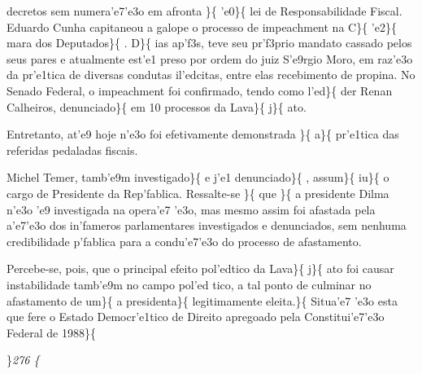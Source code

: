 decretos sem numera'e7'e3o em afronta \}\{\rtlch{}  \ltrch{}
 'e0\}\{\rtlch{}  \ltrch{}
 lei de Responsabilidade Fiscal. Eduardo
Cunha capitaneou a galope o processo de impeachment na C\}\{\rtlch{}
 \ltrch{}  'e2\}\{\rtlch{}  \ltrch{}
 mara dos Deputados\}\{\rtlch{} 
\ltrch{}  . D\}\{\rtlch{}  \ltrch{}
 ias ap'f3s, teve seu pr'f3prio mandato
cassado pelos seus pares e atualmente est'e1 preso por ordem do juiz
S'e9rgio Moro, em raz'e3o da pr'e1tica de diversas condutas il'edcitas,
entre elas recebimento de propina. No Senado Federal, o impeachment foi
confirmado, tendo como l'ed\}\{\rtlch{}  \ltrch{}
 der Renan Calheiros, denunciado\}\{\rtlch{} 
\ltrch{}  em 10 processos da
Lava\}\{\rtlch{}  \ltrch{}  j\}\{\rtlch{}
 \ltrch{}  ato. \par Entretanto,
at'e9 hoje n'e3o foi efetivamente demonstrada \}\{\rtlch{} 
\ltrch{}  a\}\{\rtlch{}  \ltrch{}
 pr'e1tica das referidas pedaladas
fiscais. \par Michel Temer, tamb'e9m investigado\}\{\rtlch{} 
\ltrch{}  e j'e1 denunciado\}\{\rtlch{} 
\ltrch{}  , assum\}\{\rtlch{} 
\ltrch{}  iu\}\{\rtlch{}  \ltrch{}
 o cargo de Presidente da Rep'fablica.
Ressalte-se \}\{\rtlch{}  \ltrch{}  que
\}\{\rtlch{}  \ltrch{}  a
presidente Dilma n'e3o 'e9 investigada na opera'e7 'e3o, mas mesmo assim
foi afastada pela a'e7'e3o dos in'fameros parlamentares investigados e
denunciados, sem nenhuma credibilidade p'fablica para a condu'e7'e3o do
processo de afastamento. \par  Percebe-se, pois, que o principal efeito
pol'edtico da Lava\}\{\rtlch{}  \ltrch{} 
j\}\{\rtlch{}  \ltrch{}  ato
foi causar instabilidade tamb'e9m no campo pol'ed tico, a tal ponto de
culminar no afastamento de um\}\{\rtlch{}  \ltrch{}
 a presidenta\}\{\rtlch{}  \ltrch{}
 legitimamente eleita.\}\{\rtlch{}
 \ltrch{}  Situa'e7 'e3o esta que fere o Estado
Democr'e1tico de Direito apregoado pela Constitui'e7'e3o Federal de
1988\}\{\rtlch{}  \ltrch{} \\
\par \}\pard \ltrpar\ql {}\sl276\widctlpar\wrapdefault\aspalpha\aspnum\faauto\adjustright{} {\rtlch{}  \ltrch{}  \page }\{\rtlch{}
 \ltrch{} 

